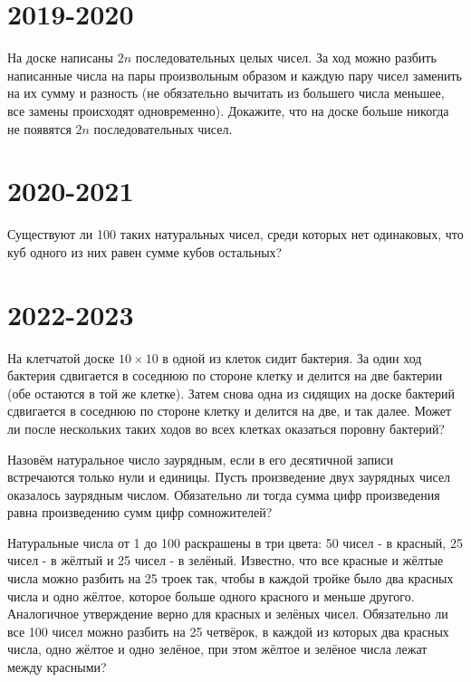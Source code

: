 \documentclass[11pt, a4paper]{template}
\begin{document}
\chapter{2019-2020}

\begin{exercise}
На доске написаны $2n$ последовательных целых чисел. За ход можно разбить написанные числа на пары \newline произвольным образом и каждую пару чисел заменить на их сумму и разность (не обязательно вычитать из большего числа меньшее, все замены происходят одновременно). Докажите, что на доске больше никогда не появятся $2n$ последовательных чисел.
\end{exercise}

\chapter{2020-2021}

\begin{exercise}
Существуют ли 100 таких натуральных чисел, среди которых нет одинаковых, что куб одного из них равен сумме кубов остальных?
\end{exercise}

\chapter{2022-2023}

\begin{exercise}
На клетчатой доске $10 \times 10$ в одной из клеток сидит бактерия. За один ход бактерия сдвигается в соседнюю по стороне клетку и делится на две бактерии (обе остаются в той же клетке). Затем снова одна из сидящих на доске бактерий сдвигается в соседнюю по стороне клетку и делится на две, и так далее. Может ли после нескольких таких ходов во всех клетках оказаться поровну бактерий?
\end{exercise}

\begin{exercise}
Назовём натуральное число заурядным, если в его десятичной записи встречаются
только нули и единицы. Пусть произведение двух заурядных чисел оказалось заурядным числом. Обязательно ли тогда сумма цифр произведения равна произведению сумм цифр сомножителей?
\end{exercise}

\begin{exercise}
Натуральные числа от 1 до 100 раскрашены в три цвета: 50 чисел - в красный, 25
чисел - в жёлтый и 25 чисел - в зелёный. Известно, что все красные и жёлтые числа можно разбить на 25 троек так, чтобы в каждой тройке было два красных числа и одно жёлтое, которое больше одного красного и меньше другого. Аналогичное утверждение верно для красных и зелёных чисел. Обязательно ли все 100 чисел можно разбить на 25 четвёрок, в каждой из которых два красных числа, одно жёлтое и одно зелёное, при этом жёлтое и зелёное числа лежат между красными?
\end{exercise}
\end{document}
